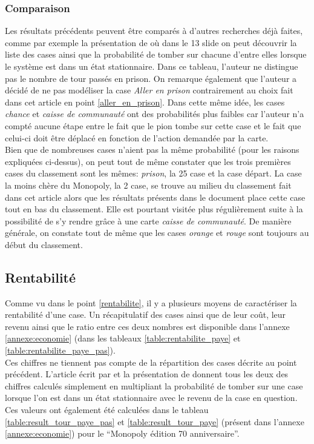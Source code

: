 \documentclass[letterpaper]{article}
\newcommand{\monopolyEditionAnni}{``Monopoly édition 70\up{ème} anniversaire''}
\begin{document}
    \subsubsection{Comparaison}
      Les résultats précédents peuvent être comparés à d'autres recherches déjà faites,
      comme par exemple la présentation de \cite{PP_MONOPOLY} où dans le 13 slide
      on peut découvrir la liste des cases ainsi que la probabilité de tomber sur
      chacune d'entre elles lorsque le système est dans un état stationnaire.  Dans ce tableau, l'auteur
      ne distingue pas le nombre de tour passés en prison.  On remarque également
      que l'auteur a décidé de ne pas modéliser la case \textit{Aller en prison}
      contrairement au choix fait dans cet article en point \ref{aller_en_prison}.
      Dans cette même idée, les cases \textit{chance} et \textit{caisse de communauté}
      ont des probabilités plus faibles car l'auteur n'a compté aucune étape entre
      le fait que le pion tombe sur cette case et le fait que celui-ci doit être
      déplacé en fonction de l'action demandée par la carte.\\
      Bien que de nombreuses cases n'aient pas la même probabilité (pour les raisons
      expliquées ci-dessus), on peut tout de même constater que les trois premières cases
      du classement sont les mêmes: \textit{prison}, la 25 case et la case départ.
      La case la moins chère du Monopoly, la 2 case, se trouve au milieu du classement
      fait dans cet article alors que les résultats présents dans le document
      place cette case tout en bas du classement.  Elle est pourtant visitée plus régulièrement
      suite à la possibilité de s'y rendre grâce à une carte \textit{caisse de communauté}.
      De manière générale, on constate tout de même que les cases \textit{orange} et
      \textit{rouge} sont toujours au début du classement.

  \subsection{Rentabilité}
    Comme vu dans le point \ref{rentabilite}, il y a plusieurs moyens
    de caractériser la rentabilité d'une case.  Un récapitulatif des cases
    ainsi que de leur coût, leur revenu ainsi que le ratio entre ces deux nombres
    est disponible dans l'annexe \ref{annexe:economie} (dans les tableaux
    \ref{table:rentabilite_paye} et \ref{table:rentabilite_paye_pas}).\\
    Ces chiffres ne tiennent pas compte de la répartition des cases décrite au
    point précédent.  L'article écrit par \cite{MONOPOLY_ARTICLE} et la
    présentation de \cite{PP_MONOPOLY} donnent tous les deux des chiffres
    calculés simplement en multipliant la probabilité de tomber sur une
    case lorsque l'on est dans un état stationnaire avec le revenu de la case
    en question.  Ces valeurs ont également été calculées dans le tableau
    \ref{table:result_tour_paye_pas} et \ref{table:result_tour_paye} 
    (présent dans l'annexe \ref{annexe:economie}) pour le \monopolyEditionAnni.
    
\end{document}
